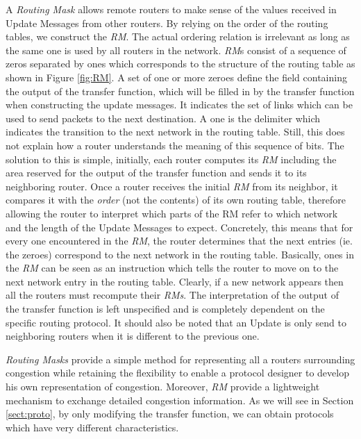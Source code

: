 A \textit{Routing Mask} allows remote routers to make sense of the values
received in Update Messages from other routers. By relying on the order of the
routing tables, we construct the \textit{RM}. The actual ordering relation is
irrelevant as long as the same one is used by all routers in the network.
\textit{RM}s consist of a sequence of zeros separated by ones which corresponds to the
structure of the routing table as shown in Figure \ref{fig:RM}. A set of one or more zeroes define the field containing the output of the transfer function, which will be filled in by the transfer function when constructing the update messages. It indicates the set of links which can be used to send packets to the next destination. A one is the delimiter which indicates the transition to the next network in the routing table. Still, this does not explain how a router understands the meaning
of this sequence of bits. The solution to this is simple, initially, each router
computes its \textit{RM} including the area reserved for the output of the
transfer function and sends it to its neighboring router. Once a router receives
the initial \textit{RM} from its neighbor, it compares it with the
\textit{order} (not the contents) of its own routing table, therefore allowing
the router to interpret which parts of the RM refer to which network and the
length of the Update Messages to expect. Concretely, this means that for every one encountered in the \textit{RM}, the router determines that the next entries (ie. the zeroes) correspond to the next network in the routing table. Basically, ones in the \textit{RM} can be seen as an instruction which tells the router to move on to the next network entry in the routing table. Clearly, if a new network appears then all the routers must recompute their \textit{RMs}. The interpretation of the output of the
transfer function is left unspecified and is completely dependent on the
specific routing protocol. It should also be noted that an Update is only send
to neighboring routers when it is different to the previous one.


\textit{Routing Masks} provide a simple method for representing all a routers surrounding congestion while retaining the flexibility to enable a protocol designer to develop his own representation of congestion. Moreover, \textit{RM} provide a lightweight mechanism to exchange detailed congestion information. As we will see in Section \ref{sect:proto}, by only modifying the transfer function, we can obtain protocols which have very different characteristics.

